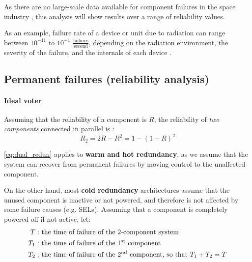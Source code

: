 \documentclass[a4paper,nobib]{tufte-book}
\def\acusepage#1{}
\begin{document}
As there are no large-scale data available for component failures in the space industry \autocite{esatec-qqd_effective_reliability_2016}, this analysis will show results over a range of reliability values.

As an example, failure rate of a device or unit due to radiation can range between \(10^{-11}\) to \(10^{-1}\) \(\frac{\text{failures}}{\text{second}}\), depending on the radiation environment, the severity of the failure, and the internals of each device \autocite[158-159]{gupta_analysis_single_2017}.


\subsection{Permanent failures (reliability analysis)}

\paragraph{\textbf{Ideal voter}}\hspace{0pt}
\acusepage{voter}


Assuming that the reliability of a component is \(R\), the reliability of \emph{two components} connected in parallel is \autocite[31]{birolini_reliability_engineering_2004}:
\begin{equation}
R_2 = 2R - R^2 = 1 - (1 - R)^2 \label{eq:dual_redun}
\end{equation}
	
	
\eqref{eq:dual_redun} applies to \textbf{warm and hot redundancy}, as we assume that the system can recover from permanent failures by moving control to the unaffected component.

On the other hand, most \textbf{cold redundancy} architectures assume that the unused component is inactive or not powered, and therefore is not affected by some failure causes (e.g. \acsp{SEL}). Assuming that a component is completely powered off if not active, let:
\begin{align*}
T: & \text{ the time of failure of the 2-component system}\\
T_1: & \text{ the time of failure of the 1\textsuperscript{st} component}\\
T_2: & \text{ the time of failure of the 2\textsuperscript{nd} component, so that } T_1 + T_2 = T\\
\end{align*}
\end{document}
